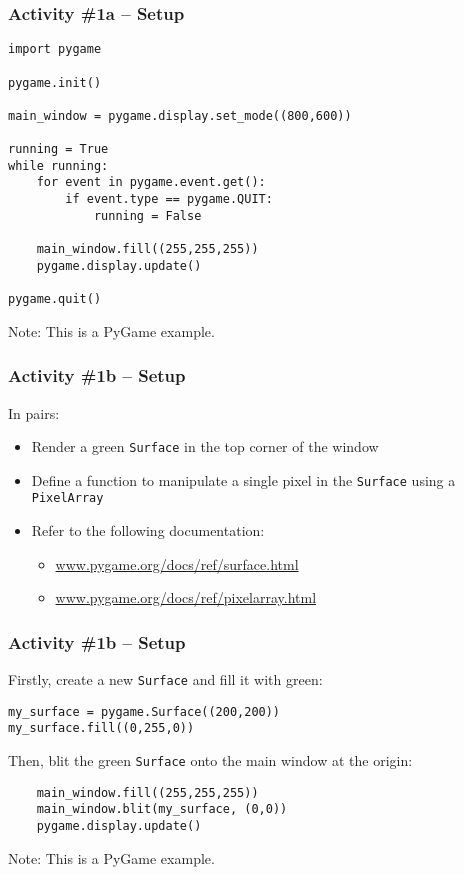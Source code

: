 \begin{frame}[fragile]
	\frametitle{Activity \#1a -- Setup}
	
\begin{lstlisting}
import pygame

pygame.init()

main_window = pygame.display.set_mode((800,600))

running = True
while running:
    for event in pygame.event.get():
        if event.type == pygame.QUIT:
            running = False

    main_window.fill((255,255,255))
    pygame.display.update()

pygame.quit()
\end{lstlisting}

Note: This is a PyGame example.

\end{frame}
	
\begin{frame}
	\frametitle{Activity \#1b -- Setup}
	
	In pairs:
	
	\vspace{2em}
	
	\begin{itemize}		
		\item Render a green \texttt{Surface} in the top corner of the window
		\item Define a function to manipulate a single pixel in the \texttt{Surface} using a \texttt{PixelArray}
		\item Refer to the following documentation:
		\begin{itemize}
			\item \url{www.pygame.org/docs/ref/surface.html}
			\item \url{www.pygame.org/docs/ref/pixelarray.html}
		\end{itemize}
	\end{itemize}
\end{frame}

\begin{frame}[fragile]
	\frametitle{Activity \#1b -- Setup}

Firstly, create a new \texttt{Surface} and fill it with green:
	
\begin{lstlisting}
my_surface = pygame.Surface((200,200))
my_surface.fill((0,255,0))
\end{lstlisting}

\vspace{0.5em}

Then, blit the green \texttt{Surface} onto the main window at the origin:

\begin{lstlisting}
    main_window.fill((255,255,255))
    main_window.blit(my_surface, (0,0))
    pygame.display.update()
\end{lstlisting}

Note: This is a PyGame example.

\end{frame}

